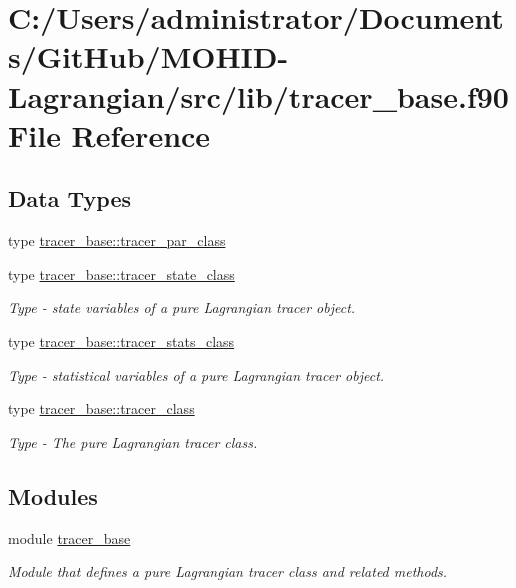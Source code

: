 \hypertarget{tracer__base_8f90}{}\section{C\+:/\+Users/administrator/\+Documents/\+Git\+Hub/\+M\+O\+H\+I\+D-\/\+Lagrangian/src/lib/tracer\+\_\+base.f90 File Reference}
\label{tracer__base_8f90}
\subsection*{Data Types}
\begin{DoxyCompactItemize}
\item 
type \hyperlink{structtracer__base_1_1tracer__par__class}{tracer\+\_\+base\+::tracer\+\_\+par\+\_\+class}
\item 
type \hyperlink{structtracer__base_1_1tracer__state__class}{tracer\+\_\+base\+::tracer\+\_\+state\+\_\+class}
\begin{DoxyCompactList}\small\item\em Type -\/ state variables of a pure Lagrangian tracer object. \end{DoxyCompactList}\item 
type \hyperlink{structtracer__base_1_1tracer__stats__class}{tracer\+\_\+base\+::tracer\+\_\+stats\+\_\+class}
\begin{DoxyCompactList}\small\item\em Type -\/ statistical variables of a pure Lagrangian tracer object. \end{DoxyCompactList}\item 
type \hyperlink{structtracer__base_1_1tracer__class}{tracer\+\_\+base\+::tracer\+\_\+class}
\begin{DoxyCompactList}\small\item\em Type -\/ The pure Lagrangian tracer class. \end{DoxyCompactList}\end{DoxyCompactItemize}
\subsection*{Modules}
\begin{DoxyCompactItemize}
\item 
module \hyperlink{namespacetracer__base}{tracer\+\_\+base}
\begin{DoxyCompactList}\small\item\em Module that defines a pure Lagrangian tracer class and related methods. \end{DoxyCompactList}\end{DoxyCompactItemize}

